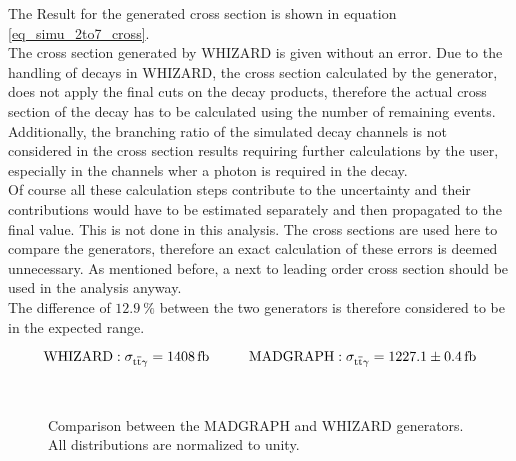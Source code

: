 The Result for the generated cross section is shown in equation \ref{eq_simu_2to7_cross}. \\
The cross section generated by WHIZARD is given without an error. Due to the handling of decays in WHIZARD, the cross section calculated by the generator, does not apply the final cuts on the decay products, therefore the actual cross section of the decay has to be calculated using the number of remaining events. Additionally, the branching ratio of the simulated decay channels is not considered in the cross section results requiring further calculations by the user, especially in the channels wher a photon is required in the decay. \\
Of course all these calculation steps contribute to the uncertainty and their contributions would have to be estimated separately and then propagated to the final value. This is not done in this analysis. The cross sections are used here to compare the generators, therefore an exact calculation of these errors is deemed unnecessary. As mentioned before, a next to leading order cross section should be used in the analysis anyway. \\
The difference of $\SI{12.9}{\percent}$ between the two generators is therefore considered to be in the expected range. 

\begin{equation}
\mathrm{WHIZARD: }\; \sigma_{\ttgamma} = \SI{1408}{\femto \barn} \hspace{1.cm} \mathrm{MADGRAPH: }\; \sigma_{\ttgamma} = \SI{1227.1 \pm 0.4}{\femto \barn}
\label{eq_simu_2to7_cross}
\end{equation}



\begin{figure}
  \\
  \caption{Comparison between the MADGRAPH and WHIZARD generators. All distributions are normalized to unity.}
  \label{fig_simu_comp_2to7_1}
\end{figure}

